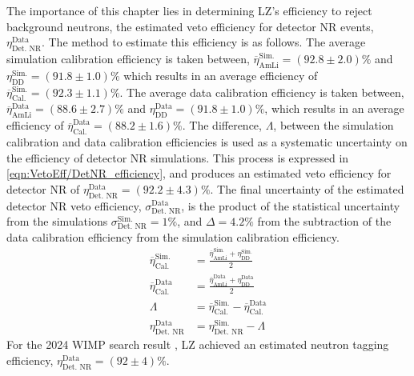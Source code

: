 The importance of this chapter lies in determining LZ's efficiency to reject background neutrons, the estimated veto efficiency for detector NR events, $\eta_{\text{Det. NR}}^{\text{Data}}$. The method to estimate this efficiency is as follows. 
The average simulation calibration efficiency is taken between, $\overline{\eta}_{\text{AmLi}}^{\text{Sim.}}=(92.8\pm2.0)\%$ and $\eta_{\text{DD}}^{\text{Sim.}}=(91.8\pm1.0)\%$ which results in an average efficiency of $\overline{\eta}_{\text{Cal.}}^{\text{Sim.}}=(92.3\pm1.1)\%$.
The average data calibration efficiency is taken between, $\overline{\eta}_{\text{AmLi}}^{\text{Data}}=(88.6\pm2.7)\%$ and $\eta_{\text{DD}}^{\text{Data}}=(91.8\pm1.0)\%$, which results in an average efficiency of $\overline{\eta}_{\text{Cal.}}^{\text{Data}}=(88.2\pm1.6)\%$.
The difference, $\Lambda$, between the simulation calibration and data calibration efficiencies is used as a systematic uncertainty on the efficiency of detector NR simulations.
This process is expressed in \autoref{eqn:VetoEff/DetNR_efficiency}, and produces an estimated veto efficiency for detector NR of $\eta_{\text{Det. NR}}^\text{Data}=(92.2\pm4.3)\%$.
The final uncertainty of the estimated detector NR veto efficiency, $\sigma^\text{Data}_\text{Det. NR}$, is the product of the statistical uncertainty from the simulations $\sigma^\text{Sim.}_\text{Det. NR}=1\%$, and $\Delta=4.2\%$ from the subtraction of the data calibration efficiency from the simulation calibration efficiency.
\begin{equation}
    \label{eqn:VetoEff/DetNR_efficiency}
    \begin{split}
    	\overline{\eta}_{\text{Cal.}}^{\text{Sim.}} & = \frac{\overline{\eta}_{\text{AmLi}}^{\text{Sim.}}+\eta_{\text{DD}}^{\text{Sim.}}}{2}\\
    	\overline{\eta}_{\text{Cal.}}^{\text{Data}} & = \frac{\overline{\eta}_{\text{AmLi}}^{\text{Data}}+\eta_{\text{DD}}^{\text{Data}}}{2} \\
    	\Lambda &= \overline{\eta}_{\text{Cal.}}^{\text{Sim.}} - \overline{\eta}_{\text{Cal.}}^{\text{Data}}\\
    	\eta_\text{Det. NR}^\text{Data}   & = \eta_\text{Det. NR}^\text{Sim.} - \Lambda
    \end{split}
\end{equation}
For the 2024 WIMP search result \cite{LZCollaboration:2024lux}, LZ achieved an estimated neutron tagging efficiency, $\eta_\text{Det. NR}^\text{Data}=(92\pm4)\%$.

